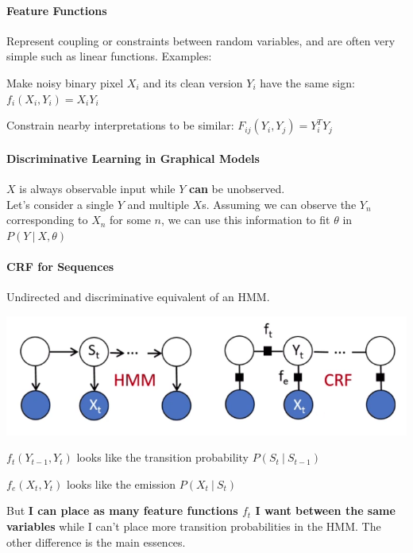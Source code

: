 \documentclass[10pt]{report}
\begin{document}
\paragraph{Feature Functions} Represent coupling or constraints between random variables, and are often very simple such as linear functions. Examples:
\begin{list}{}{}
	\item Make noisy binary pixel $X_i$ and its clean version $Y_i$ have the same sign: $f_i(X_i,Y_i)=X_iY_i$
	\item Constrain nearby interpretations to be similar: $F_{ij}(Y_i, Y_j) = Y_i^TY_j$
\end{list}

\paragraph{Discriminative Learning in Graphical Models} $X$ is always observable input while $Y$ \textbf{can} be unobserved.\\
Let's consider a single $Y$ and multiple $X$s. Assuming we can observe the $Y_n$ corresponding to $X_n$ for some $n$, we can use this information to fit $\theta$ in $P(Y\:|\:X,\theta)$
\paragraph{CRF for Sequences} Undirected and discriminative equivalent of an HMM.\begin{center}
	\includegraphics[scale=0.5]{36.png}
\end{center}
\begin{list}{}{}
	\item $f_t(Y_{t-1}, Y_t)$ looks like the transition probability $P(S_t\:|\:S_{t-1})$
	\item $f_e(X_t, Y_t)$ looks like the emission $P(X_t\:|\:S_t)$
\end{list}
But \textbf{I can place as many feature functions $f_t$ I want between the same variables} while I can't place more transition probabilities in the HMM. The other difference is the main essences.
\end{document}

